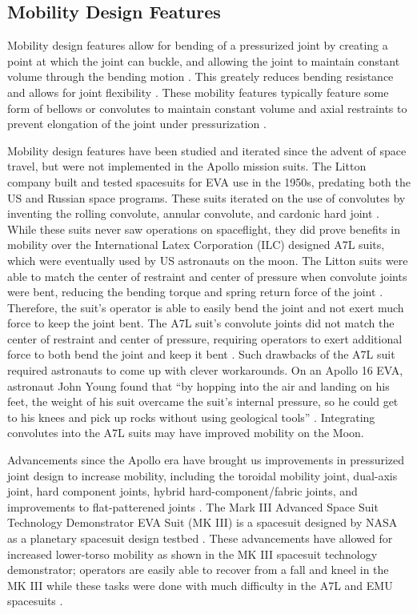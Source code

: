 \documentclass[defaultstyle,11pt]{comps}
\begin{document}
\hypertarget{mobility-design-features}{%
\subsection{Mobility Design Features}\label{mobility-design-features}}

Mobility design features allow for bending of a pressurized joint by creating a point at which the joint can buckle, and allowing the joint to maintain constant volume through the bending motion \citep{Harris2001}.
This greately reduces bending resistance and allows for joint flexibility \citep{Harris2001}.
These mobility features typically feature some form of bellows or convolutes to maintain constant volume and axial restraints to prevent elongation of the joint under pressurization \citep{Harris2001}.

Mobility design features have been studied and iterated since the advent of space travel, but were not implemented in the Apollo mission suits.
The Litton company built and tested spacesuits for EVA use in the 1950s, predating both the US and Russian space programs.
These suits iterated on the use of convolutes by inventing the rolling convolute, annular convolute, and cardonic hard joint \citep{Harris2001}.
While these suits never saw operations on spaceflight, they did prove benefits in mobility over the International Latex Corporation (ILC) designed A7L suits, which were eventually used by US astronauts on the moon.
The Litton suits were able to match the center of restraint and center of pressure when convolute joints were bent, reducing the bending torque and spring return force of the joint \citep{Harris2001}.
Therefore, the suit's operator is able to easily bend the joint and not exert much force to keep the joint bent.
The A7L suit's convolute joints did not match the center of restraint and center of pressure, requiring operators to exert additional force to both bend the joint and keep it bent \citep{Harris2001}.
Such drawbacks of the A7L suit required astronauts to come up with clever workarounds.
On an Apollo 16 EVA, astronaut John Young found that ``by hopping into the air and landing on his feet, the weight of his suit overcame the suit's internal pressure, so he could get to his knees and pick up rocks without using geological tools'' \citep{Portree1997}.
Integrating convolutes into the A7L suits may have improved mobility on the Moon.

Advancements since the Apollo era have brought us improvements in pressurized joint design to increase mobility, including the toroidal mobility joint, dual-axis joint, hard component joints, hybrid hard-component/fabric joints, and improvements to flat-patterened joints \citep{Harris2001}.
The Mark III Advanced Space Suit Technology Demonstrator EVA Suit (MK III) is a spacesuit designed by NASA as a planetary spacesuit design testbed \citep{Kosmo1988}.
These advancements have allowed for increased lower-torso mobility as shown in the MK III spacesuit technology demonstrator; operators are easily able to recover from a fall and kneel in the MK III while these tasks were done with much difficulty in the A7L and EMU spacesuits \citep{Kosmo1998}.
\end{document}
